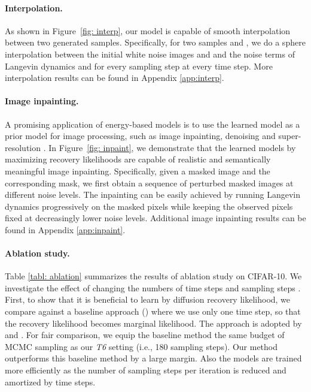 \documentclass{article} \usepackage{iclr2021_conference,times}
\def\Figref#1{Figure~\ref{#1}}
\begin{document}
\paragraph{Interpolation.} As shown in \Figref{fig: interp}, our model is capable of smooth interpolation between two generated samples. Specifically, for two samples  and , we do a sphere interpolation between the initial white noise images  and  and the noise terms of Langevin dynamics  and  for every sampling step at every time step. More interpolation results can be found in Appendix \ref{app:interp}. 

\paragraph{Image inpainting.} A promising application of energy-based models is to use the learned model as a prior model for image processing, such as image inpainting, denoising and super-resolution \citep{gao2018learning, du2019implicit, song2019generative}. In \Figref{fig: inpaint}, we demonstrate that the learned models by maximizing recovery likelihoods are capable of realistic and semantically meaningful image inpainting. Specifically, given a masked image and the corresponding mask, we first obtain a sequence of perturbed masked images at different noise levels. The inpainting can be easily achieved by running Langevin dynamics progressively on the masked pixels while keeping the observed pixels fixed at decreasingly lower noise levels. Additional image inpainting results can be found in Appendix \ref{app:inpaint}.

\paragraph{Ablation study.}
Table \ref{tabl: ablation} summarizes the results of ablation study on CIFAR-10. We investigate the effect of changing the numbers of time steps  and sampling steps . First, to show that it is beneficial to learn by diffusion recovery likelihood, we compare against a baseline approach () where we use only one time step, so that the recovery likelihood becomes marginal likelihood. The approach is adopted by \citet{nijkamp2019learning} and \citet{du2019implicit}. For fair comparison, we equip the baseline method the same budget of MCMC sampling as our {\em T6} setting (i.e., 180 sampling steps). Our method outperforms this baseline method by a large margin. Also the models are trained more efficiently as the number of sampling steps per iteration is reduced and amortized by time steps. 
\end{document}
